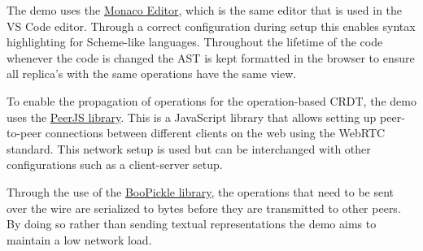 The demo uses the \href{https://microsoft.github.io/monaco-editor/}{Monaco Editor}, which is the same editor
that is used in the VS Code editor.
Through a correct configuration during setup this enables syntax highlighting for Scheme-like languages.
Throughout the lifetime of the code whenever the code is changed the AST is kept formatted in the browser to ensure
all replica's with the same operations have the same view.

To enable the propagation of operations for the operation-based CRDT, the demo uses the
\href{https://peerjs.com/}{PeerJS library}.
This is a JavaScript library that allows setting up peer-to-peer connections between different clients on the web using
the WebRTC standard.
This network setup is used but can be interchanged with other configurations such as a client-server setup.

Through the use of the \href{https://github.com/suzaku-io/boopickle}{BooPickle library}, the operations that need to be
sent over the wire are serialized to bytes before they are transmitted to other peers.
By doing so rather than sending textual representations the demo aims to maintain a low network load.
